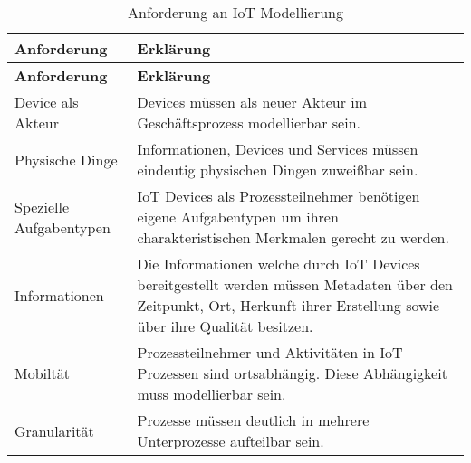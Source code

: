  \begin{longtable}{P{4.5cm}|X}
  \caption{Anforderung an IoT Modellierung}\\
  \label{table:evaluierungskriterien}
  \textbf{Anforderung} & \textbf{Erklärung}   \\ \hline
  \endfirsthead %
  \textbf{Anforderung} & \textbf{Erklärung}  \\ \hline
  \endhead %
Device als Akteur & Devices müssen als neuer Akteur im Geschäftsprozess modellierbar sein.\\ \hline
Physische Dinge  & Informationen, Devices und Services müssen eindeutig physischen Dingen zuweißbar sein.\\ \hline
Spezielle Aufgabentypen & IoT Devices als Prozessteilnehmer benötigen eigene Aufgabentypen um ihren charakteristischen Merkmalen gerecht zu werden.\\ \hline
Informationen  & Die Informationen welche durch IoT Devices bereitgestellt werden müssen Metadaten über den Zeitpunkt, Ort, Herkunft ihrer Erstellung sowie über ihre Qualität besitzen.\\ \hline
Mobiltät & Prozessteilnehmer und Aktivitäten in IoT Prozessen sind ortsabhängig. Diese Abhängigkeit muss modellierbar sein.\\ \hline
Granularität & Prozesse müssen deutlich in mehrere Unterprozesse aufteilbar sein.\\
 \end{longtable}

